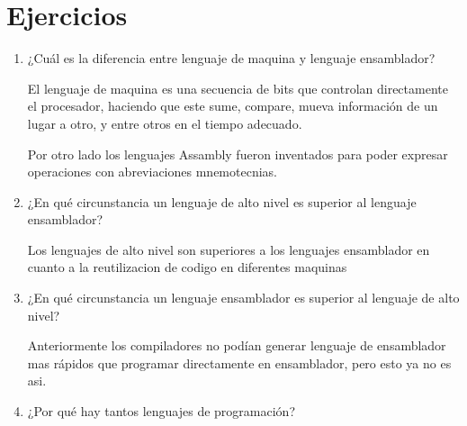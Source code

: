 \documentclass{article}
\begin{document}
	\section{Ejercicios}\label{sec:ejercicios}
	\begin{enumerate}
		\item ¿Cuál es la diferencia entre lenguaje de maquina y lenguaje ensamblador?
		
		El lenguaje de maquina es una secuencia de bits que controlan directamente el procesador, haciendo que este sume, compare, mueva información de un lugar a otro, y entre otros en el tiempo adecuado. \cite{10.5555/1610485}
		
		Por otro lado los lenguajes Assambly fueron inventados para poder expresar operaciones con abreviaciones mnemotecnias.\cite{10.5555/1610485}

		
		\item ¿En qué circunstancia un lenguaje de alto nivel es superior al lenguaje ensamblador?
		
		Los lenguajes de alto nivel son superiores a los lenguajes ensamblador en cuanto a la reutilizacion de codigo en diferentes maquinas
		
	\item ¿En qué circunstancia un lenguaje ensamblador es superior al lenguaje de alto nivel?
	
	Anteriormente los compiladores no podían generar lenguaje de ensamblador mas rápidos que programar directamente en ensamblador, pero esto ya no es asi.
	
\item ¿Por qué hay tantos lenguajes de programación?


\end{enumerate}
\end{document}
